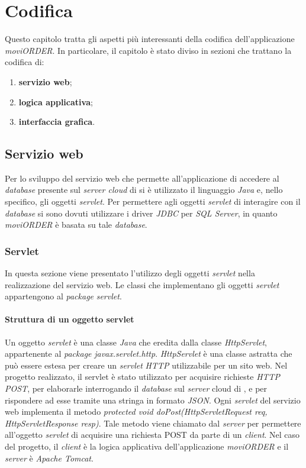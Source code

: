 \chapter{Codifica} \label{codifica}

Questo capitolo tratta gli aspetti più interessanti della codifica dell'applicazione \textit{moviORDER}. In particolare, il capitolo è stato diviso in sezioni che trattano la codifica di:
\begin{enumerate}
	\item \textbf{servizio web};
	\item \textbf{logica applicativa};
	\item \textbf{interfaccia grafica}.
\end{enumerate}

\section{Servizio web} \label{codificaservizio}

Per lo sviluppo del servizio web che permette all'applicazione di accedere al \textit{database} presente sul \textit{server cloud} di \visione{} si è utilizzato il linguaggio \textit{Java} e, nello specifico, gli oggetti \textit{servlet}. Per permettere agli oggetti \textit{servlet} di interagire con il \textit{database} si sono dovuti utilizzare i driver \textit{JDBC} per \textit{SQL Server}, in quanto \textit{moviORDER} è basata su tale \textit{database}. 

\subsection{Servlet}

In questa sezione viene presentato l'utilizzo degli oggetti \textit{servlet} nella realizzazione del servizio web. Le classi che implementano gli oggetti \textit{servlet} appartengono al \textit{package} \textit{servlet}.

\subsubsection{Struttura di un oggetto servlet}

Un oggetto \textit{servlet} è una classe \textit{Java} che eredita dalla classe \textit{HttpServlet}, appartenente al \textit{package} \textit{javax.servlet.http}. \textit{HttpServlet} è una classe astratta che può essere estesa per creare un \textit{servlet} \textit{HTTP} utilizzabile per un sito web. Nel progetto realizzato, il servlet è stato utilizzato per acquisire richieste \textit{HTTP POST}, per elaborarle interrogando il \textit{database} sul \textit{server} cloud di \visione{}, e per rispondere ad esse tramite una stringa in formato \textit{JSON}. Ogni \textit{servlet} del servizio web implementa il metodo \textit{protected void doPost(HttpServletRequest req, HttpServletResponse resp)}. Tale metodo viene chiamato dal \textit{server} per permettere all'oggetto \textit{servlet} di acquisire una richiesta POST da parte di un \textit{client}. Nel caso del progetto, il \textit{client} è la logica applicativa dell'applicazione \textit{moviORDER} e il \textit{server} è \textit{Apache Tomcat}.

